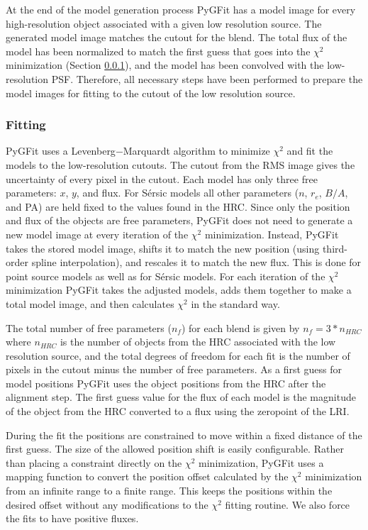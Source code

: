 \documentclass[preprint]{aastex}
\newcommand{\sersic}{S\'{e}rsic}
\newcommand{\pygfit}{PyGFit}
\begin{document}
At the end of the model generation process \pygfit{} has a model image for every high-resolution object associated with a given low resolution source.  The generated model image matches the cutout for the blend.  The total flux of the model has been normalized to match the first guess that goes into the $\chi^2$ minimization (Section \ref{sec:fitting}), and the model has been convolved with the low-resolution PSF.  Therefore, all necessary steps have been performed to prepare the model images for fitting to the cutout of the low resolution source.

\subsubsection{Fitting}\label{sec:fitting}

\pygfit{} uses a Levenberg$-$Marquardt algorithm to minimize $\chi^2$ and fit the models to the low-resolution cutouts.  The cutout from the RMS image gives the uncertainty of every pixel in the cutout.  Each model has only three free parameters: $x$, $y$, and flux.  For \sersic{} models all other parameters ($n$, $r_e$, $B/A$, and PA) are held fixed to the values found in the HRC.  Since only the position and flux of the objects are free parameters, \pygfit{} does not need to generate a new model image at every iteration of the $\chi^2$ minimization.  Instead, \pygfit{} takes the stored model image, shifts it to match the new position (using third-order spline interpolation), and rescales it to match the new flux.  This is done for point source models as well as for \sersic{} models.  For each iteration of the $\chi^2$ minimization \pygfit{} takes the adjusted models, adds them together to make a total model image, and then calculates $\chi^2$ in the standard way.

The total number of free parameters ($n_f$) for each blend is given by $n_f=3*n_{HRC}$ where $n_{HRC}$ is the number of objects from the HRC associated with the low resolution source, and the total degrees of freedom for each fit is the number of pixels in the cutout minus the number of free parameters.  As a first guess for model positions \pygfit{} uses the object positions from the HRC after the alignment step.  The first guess value for the flux of each model is the magnitude of the object from the HRC converted to a flux using the zeropoint of the LRI.

During the fit the positions are constrained to move within a fixed distance of the first guess.  The size of the allowed position shift is easily configurable.  Rather than placing a constraint directly on the $\chi^2$ minimization, \pygfit{} uses a mapping function to convert the position offset calculated by the $\chi^2$ minimization from an infinite range to a finite range.  This keeps the positions within the desired offset without any modifications to the $\chi^2$  fitting routine.  We also force the fits to have positive fluxes.
\end{document}
